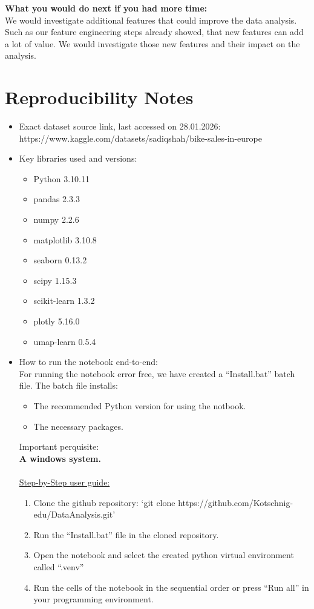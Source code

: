 \documentclass[11pt]{article}
\begin{document}
\vspace{1em}
\noindent\textbf{What you would do next if you had more time:}\\
We would investigate additional features that could improve the data analysis.
Such as our feature engineering steps already showed, that new features can add a lot of value.
We would investigate those new features and their impact on the analysis.






\section{Reproducibility Notes}
\begin{itemize}[leftmargin=*]
    \item Exact dataset source link, last accessed on 28.01.2026: https://www.kaggle.com/datasets/sadiqshah/bike-sales-in-europe
    \item Key libraries used and versions:
    \begin{itemize}[leftmargin=*]
        \item Python 3.10.11
        \item pandas 2.3.3
        \item numpy 2.2.6
        \item matplotlib 3.10.8
        \item seaborn 0.13.2
        \item scipy 1.15.3
        \item scikit-learn 1.3.2
        \item plotly 5.16.0 
        \item umap-learn 0.5.4
    \end{itemize}   
    \item How to run the notebook end-to-end:\\
For running the notebook error free, we have created a “Install.bat” batch file. The batch file installs:
	\begin{itemize}[leftmargin=*]
        \item The recommended Python version for using the notbook.
        \item The necessary packages.
    \end{itemize}
Important perquisite: \\
\textbf{A windows system.}\\

\\
\underline{Step-by-Step user guide:}
	\begin{enumerate}[leftmargin=*]
        \item Clone the github repository: ‘git clone https://github.com/Kotschnig-edu/DataAnalysis.git’ 
        \item Run the “Install.bat” file in the cloned repository.
        \item Open the notebook and select the created python virtual environment called “.venv”
        \item Run the cells of the notebook in the sequential order or press “Run all” in your programming environment.
    \end{enumerate}


\end{itemize}
\end{document}
